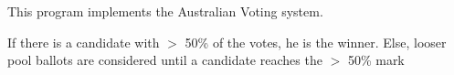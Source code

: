 This program implements the Australian Voting system.

If there is a candidate with $>$ 50\% of the votes, he is the winner. Else, looser pool ballots are considered until a candidate reaches the $>$ 50\% mark 